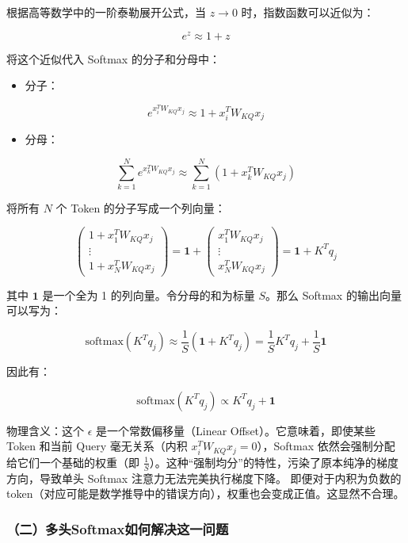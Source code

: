 根据高等数学中的一阶泰勒展开公式，当 \(z \to 0\) 时，指数函数可以近似为：

\[
e^z \approx 1 + z
\]

将这个近似代入 Softmax 的分子和分母中：

\begin{itemize}
\tightlist
\item
  分子：
\end{itemize}

\[
e^{x_i^T W_{KQ}x_j} \approx 1 + x_i^T W_{KQ}x_j
\]

\begin{itemize}
\tightlist
\item
  分母：
\end{itemize}

\[
\sum_{k=1}^{N} e^{x_k^T W_{KQ}x_j} \approx \sum_{k=1}^{N}(1+x_k^T W_{KQ}x_j)
\]

将所有 \(N\) 个 Token 的分子写成一个列向量：

\[
\begin{pmatrix}
1+x_1^T W_{KQ}x_j \\
\vdots \\
1+x_N^T W_{KQ}x_j
\end{pmatrix}
=
\mathbf{1}+
\begin{pmatrix}
x_1^T W_{KQ}x_j \\
\vdots \\
x_N^T W_{KQ}x_j
\end{pmatrix}
= \mathbf{1}+K^Tq_j
\]

其中 \(\mathbf{1}\) 是一个全为 1 的列向量。令分母的和为标量 \(S\)。那么 Softmax 的输出向量可以写为：

\[
\mathrm{softmax}(K^Tq_j) \approx \frac{1}{S}(\mathbf{1}+K^Tq_j)
= \frac{1}{S}K^Tq_j+\frac{1}{S}\mathbf{1}
\]

因此有：

\[
\mathrm{softmax}(K^Tq_j) \propto K^Tq_j+\mathbf{1}
\]

物理含义：这个 \(\epsilon\) 是一个常数偏移量（Linear Offset）。它意味着，即使某些 Token 和当前 Query 毫无关系（内积 \(x_i^TW_{KQ}x_j=0\)），Softmax 依然会强制分配给它们一个基础的权重（即 \(\frac{1}{S}\)）。这种``强制均分''的特性，污染了原本纯净的梯度方向，导致单头 Softmax 注意力无法完美执行梯度下降。
即便对于内积为负数的token（对应可能是数学推导中的错误方向），权重也会变成正值。这显然不合理。

\hypertarget{ux4e8cux591aux5934softmaxux5982ux4f55ux89e3ux51b3ux8fd9ux4e00ux95eeux9898}{%
\subsubsection{（二）多头Softmax如何解决这一问题}\label{ux4e8cux591aux5934softmaxux5982ux4f55ux89e3ux51b3ux8fd9ux4e00ux95eeux9898}}

